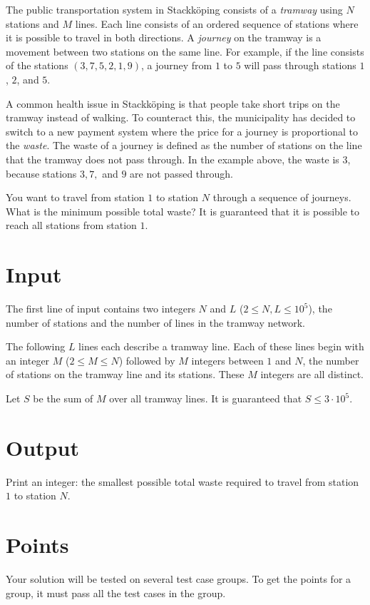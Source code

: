 \noindent
The public transportation system in Stackköping consists of a \textit{tramway} using $N$ stations and $M$ lines.
Each line consists of an ordered sequence of stations where it is possible to travel in both directions.
A \textit{journey} on the tramway is a movement between two stations on the same line.
For example, if the line consists of the stations $(3,7,5,2,1,9)$, a journey from $1$ to $5$
will pass through stations $1$, $2$, and $5$.

A common health issue in Stackköping is that people take short trips on the tramway instead
of walking. To counteract this, the municipality has decided to switch to a new payment system
where the price for a journey is proportional to the \textit{waste}. The waste of a journey
is defined as the number of stations on the line that the tramway does not pass through. In the example above,
the waste is $3$, because stations $3,7,$ and $9$ are not passed through.

You want to travel from station $1$ to station $N$ through a sequence of journeys.
What is the minimum possible total waste?
It is guaranteed that it is possible to reach all stations from station $1$.

\section*{Input}
The first line of input contains two integers $N$ and $L$ ($2 \leq N,L \leq 10^5$),
the number of stations and the number of lines in the tramway network.

The following $L$ lines each describe a tramway line. Each of these lines begin with an
integer $M$ ($2 \le M \le N$) followed by $M$ integers between $1$ and $N$, the number of
stations on the tramway line and its stations. These $M$ integers are all distinct.

Let $S$ be the sum of $M$ over all tramway lines. It is guaranteed that $S \leq 3 \cdot 10^5$.

\section*{Output}
Print an integer: the smallest possible total waste required to travel from station $1$ to
station $N$.

\section*{Points}
Your solution will be tested on several test case groups.
To get the points for a group, it must pass all the test cases in the group.

